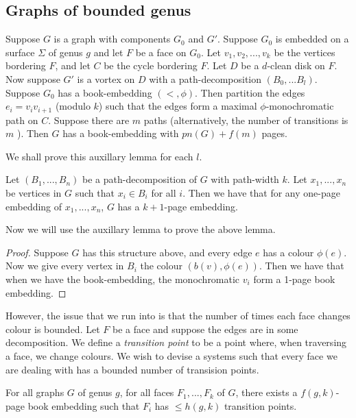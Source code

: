 \subsection{Graphs of bounded genus}

\begin{lemma}
	Suppose $G$ is a graph with components $G_0$ and $G'$. Suppose $G_0$ is embedded on a surface $\Sigma$ of genus $g$ and let $F$ be a face on $G_0$. Let $v_1, v_2, ..., v_k$ be the vertices bordering $F$, and let $C$ be the cycle bordering $F$. Let $D$ be a $d$-clean disk on $F$. Now suppose $G'$ is a vortex on $D$ with a path-decomposition $(B_0, ... B_l)$. Suppose $G_0$ has a book-embedding $(<, \phi)$. Then partition the edges $e_i = v_i v_{i + 1}$ (modulo $k$) such that the edges form a maximal $\phi$-monochromatic path on $C$. Suppose there are $m$ paths (alternatively, the number of transitions is $m$ ). Then $G$ has a book-embedding with $pn(G) + f(m)$ pages.
\end{lemma}
We shall prove this auxillary lemma for each $l$. 
\begin{lemma}
	Let $(B_1, ..., B_n)$ be a path-decomposition of $G$ with path-width $k$. Let $x_1, ..., x_n$ be vertices in $G$ such that $x_i \in B_i$ for all $i$. Then we have that for any one-page embedding of $x_1, ..., x_n$, $G$ has a $k + 1$-page embedding. 
\end{lemma}
Now we will use the auxillary lemma to prove the above lemma.
\begin{proof}
	Suppose $G$ has this structure above, and every edge $e$ has a colour $\phi(e)$. 
	Now we give every vertex in $B_i$ the colour $(b(v),  \phi(e))$. Then we have that when we have the book-embedding, the monochromatic $v_i$ form a 1-page book embedding.
\end{proof}
However, the issue that we run into is that the number of times each face changes colour is bounded. Let $F$ be a face and suppose the edges are in some decomposition. We define a \textit{transition point} to be a point where, when traversing a face, we change colours. We wish to devise a systems such that every face we are dealing with has a bounded number of transision points.

\begin{theorem}
	For all graphs $G$ of genus $g$, for all faces $F_1, ..., F_k$ of $G$, there exists a $f(g, k)$-page book embedding such that $F_i$ has $\leq h(g, k)$ transition points. 
\end{theorem}

